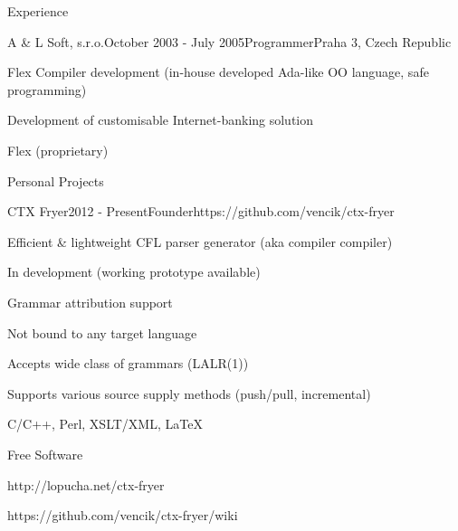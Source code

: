 \documentclass{resume} %
\begin{document}
\begin{rSection}{Experience}

\begin{rSubsection}{A \& L Soft, s.r.o.}{October 2003 - July 2005}{Programmer}{Praha 3, Czech Republic}
\item Flex Compiler development (in-house developed Ada-like OO language, safe programming)
\item Development of customisable Internet-banking solution
\item Flex (proprietary)
\end{rSubsection}

\end{rSection}


\begin{rSection}{Personal Projects}


\begin{rSubsection}{CTX Fryer}{2012 - Present}{Founder}{https://github.com/vencik/ctx-fryer}
\item Efficient \& lightweight CFL parser generator (aka compiler compiler)
\item In development (working prototype available)
\item Grammar attribution support
\item Not bound to any target language
\item Accepts wide class of grammars (LALR(1))
\item Supports various source supply methods (push/pull, incremental)
\item C/C++, Perl, XSLT/XML, \LaTeX
\item Free Software
\item http://lopucha.net/ctx-fryer
\item https://github.com/vencik/ctx-fryer/wiki
\end{rSubsection}

\end{rSection}

\end{document}
